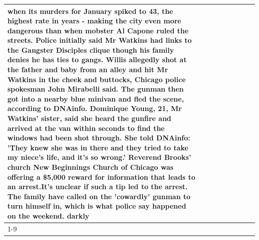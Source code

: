 \begin{table}[H]
\begin{tabular}{lllrlllll}
when its murders for January spiked to 43, the highest rate in years - making the city even more dangerous than when mobster Al Capone ruled the streets. Police initially said Mr Watkins had links to the Gangster Disciples clique though his family denies he has ties to gangs. Willis allegedly shot at the father and baby from an alley and hit Mr Watkins in the cheek and buttocks, Chicago police spokesman John Mirabelli said. The gunman then got into a nearby blue minivan and fled the scene, according to DNAinfo. Dominique Young, 21, Mr Watkins' sister, said she heard the gunfire and arrived at the van within seconds to find the windows had been shot through. She told DNAinfo: 'They knew she was in there and they tried to take my niece's life, and it's so wrong.' Reverend Brooks' church New Beginnings Church of Chicago was offering a \$5,000 reward for information that leads to an arrest.It's unclear if such a tip led to the arrest. The family have called on the 'cowardly' gunman to turn himself in, which is what police say happened on the weekend. darkly \\
\cline{1-9}

\end{tabular}
\end{table}
